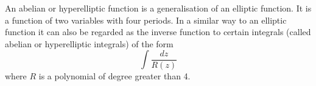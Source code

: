 \documentclass[12pt]{article}
\begin{document}
An abelian or hyperelliptic function is a generalisation of an elliptic function. It is a function of two variables with four periods.
In a similar way to an elliptic function it can also be regarded as the inverse function to certain integrals (called abelian or hyperelliptic integrals) of the form 
$$\int\frac{dz}{R(z)} $$
where $R$ is a polynomial of degree greater than 4.
\end{document}
